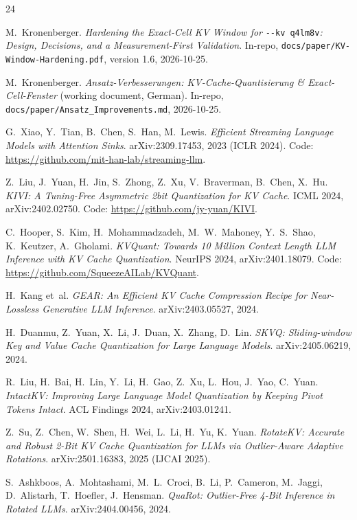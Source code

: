 \documentclass[10pt,twocolumn]{article}
\begin{document}
\begin{thebibliography}{24}
\setlength{\itemsep}{0pt}\footnotesize\raggedright

M.~Kronenberger.
\emph{Hardening the Exact-Cell KV Window for} \texttt{-{}-kv q4lm8v}\emph{: Design, Decisions, and a Measurement-First Validation}.
In-repo, \texttt{docs/paper/KV-Window-Hardening.pdf}, version 1.6, 2026-10-25.

M.~Kronenberger.
\emph{Ansatz-Verbesserungen: KV-Cache-Quantisierung \& Exact-Cell-Fenster} (working document, German).
In-repo, \texttt{docs/paper/Ansatz\_Improvements.md}, 2026-10-25.

G.~Xiao, Y.~Tian, B.~Chen, S.~Han, M.~Lewis.
\emph{Efficient Streaming Language Models with Attention Sinks}.
arXiv:2309.17453, 2023 (ICLR 2024). Code: \url{https://github.com/mit-han-lab/streaming-llm}.

Z.~Liu, J.~Yuan, H.~Jin, S.~Zhong, Z.~Xu, V.~Braverman, B.~Chen, X.~Hu.
\emph{KIVI: A Tuning-Free Asymmetric 2bit Quantization for KV Cache}.
ICML 2024, arXiv:2402.02750. Code: \url{https://github.com/jy-yuan/KIVI}.

C.~Hooper, S.~Kim, H.~Mohammadzadeh, M.~W.~Mahoney, Y.~S.~Shao, K.~Keutzer, A.~Gholami.
\emph{KVQuant: Towards 10 Million Context Length LLM Inference with KV Cache Quantization}.
NeurIPS 2024, arXiv:2401.18079. Code: \url{https://github.com/SqueezeAILab/KVQuant}.

H.~Kang et~al.
\emph{GEAR: An Efficient KV Cache Compression Recipe for Near-Lossless Generative LLM Inference}.
arXiv:2403.05527, 2024.

H.~Duanmu, Z.~Yuan, X.~Li, J.~Duan, X.~Zhang, D.~Lin.
\emph{SKVQ: Sliding-window Key and Value Cache Quantization for Large Language Models}.
arXiv:2405.06219, 2024.

R.~Liu, H.~Bai, H.~Lin, Y.~Li, H.~Gao, Z.~Xu, L.~Hou, J.~Yao, C.~Yuan.
\emph{IntactKV: Improving Large Language Model Quantization by Keeping Pivot Tokens Intact}.
ACL Findings 2024, arXiv:2403.01241.

Z.~Su, Z.~Chen, W.~Shen, H.~Wei, L.~Li, H.~Yu, K.~Yuan.
\emph{RotateKV: Accurate and Robust 2-Bit KV Cache Quantization for LLMs via Outlier-Aware Adaptive Rotations}.
arXiv:2501.16383, 2025 (IJCAI 2025).

S.~Ashkboos, A.~Mohtashami, M.~L.~Croci, B.~Li, P.~Cameron, M.~Jaggi, D.~Alistarh, T.~Hoefler, J.~Hensman.
\emph{QuaRot: Outlier-Free 4-Bit Inference in Rotated LLMs}.
arXiv:2404.00456, 2024.


\end{thebibliography}
\end{document}
